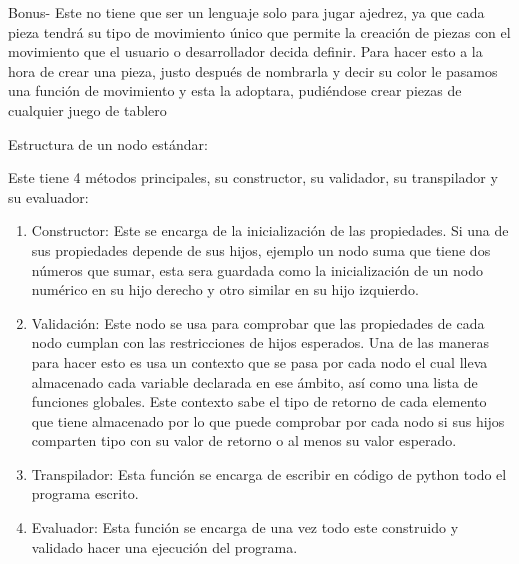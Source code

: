 \documentclass[10pt,a4paper]{article}
\begin{document}
Bonus- Este no tiene que ser un lenguaje solo para jugar ajedrez, ya que cada pieza tendrá su tipo de movimiento único que permite la creación de piezas con el movimiento que el usuario o desarrollador decida definir. Para hacer esto a la hora de crear una pieza, justo después de nombrarla y decir su color le pasamos una función de movimiento y esta la adoptara, pudiéndose crear piezas de cualquier juego de tablero

Estructura de un nodo estándar:

Este tiene 4 métodos principales, su constructor, su validador, su transpilador y su evaluador:
\begin{enumerate}

\item Constructor: Este se encarga de la inicialización de las propiedades. Si una de sus propiedades depende de sus hijos, ejemplo un nodo suma que tiene dos números que sumar, esta sera guardada como la inicialización de un nodo numérico en su hijo derecho y otro similar en su hijo izquierdo.
 
\item Validación:  Este nodo se usa para comprobar que las propiedades de cada nodo cumplan con las restricciones de hijos esperados. Una de las maneras para hacer esto es usa un contexto que se pasa por cada nodo el cual lleva almacenado cada variable declarada en ese ámbito, así como una lista de funciones globales. Este contexto sabe el tipo de retorno de cada elemento que tiene almacenado por lo que puede comprobar por cada nodo si sus hijos comparten tipo con su valor de retorno o al menos su valor esperado.

\item Transpilador: Esta función se encarga de escribir en código de python todo el programa escrito.

\item Evaluador: Esta función se encarga de una vez todo este construido y validado hacer una ejecución del programa.

\end{enumerate}
\end{document}
